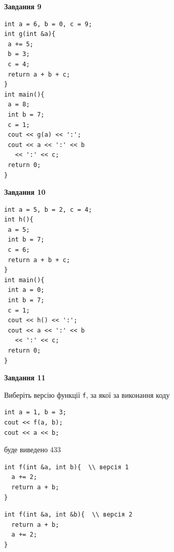 \documentclass[12pt, ukrainian]{article}
\def\code#1{\Verb!#1!}
\begin{document}
{\begin {large}
\begin{minipage}[t]{11.0cm}
\end{minipage}


\begin{minipage}[t]{7.0cm}

\begin{center}
\textbf{Завдання 9}
\end{center}
\vspace{-8mm}

\begin{verbatim}
int a = 6, b = 0, c = 9;
int g(int &a){
 a += 5;
 b = 3;
 c = 4;
 return a + b + c;
}
int main(){
 a = 8;
 int b = 7;
 c = 1;
 cout << g(a) << ':';
 cout << a << ':' << b 
   << ':' << c;
 return 0;
}
\end{verbatim}



\begin{center}
\textbf{Завдання 10}
\end{center}
\vspace{-8mm}

\begin{verbatim}
int a = 5, b = 2, c = 4;
int h(){
 a = 5;
 int b = 7;
 c = 6;
 return a + b + c;
}
int main(){
 int a = 0;
 int b = 7;
 c = 1;
 cout << h() << ':';
 cout << a << ':' << b 
   << ':' << c;
 return 0;
}
\end{verbatim}

\end{minipage}
\vline \hspace{1mm}
\begin{minipage}[t]{11.0cm}

\begin{center}
\textbf{Завдання 11}
\end{center}
Виберіть версію функції \code{f}, за якої за виконання коду
\begin{verbatim}
int a = 1, b = 3;
cout << f(a, b);
cout << a << b;
\end{verbatim}

буде виведено 433

\begin{verbatim}
int f(int &a, int b){  \\ версія 1
  a += 2;
  return a + b;
}
\end{verbatim}

\vspace{-8mm}\begin{verbatim}
int f(int &a, int &b){  \\ версія 2
  return a + b;
  a += 2;
}
\end{verbatim}


\end{minipage}
\end{large}}
\end{document}
